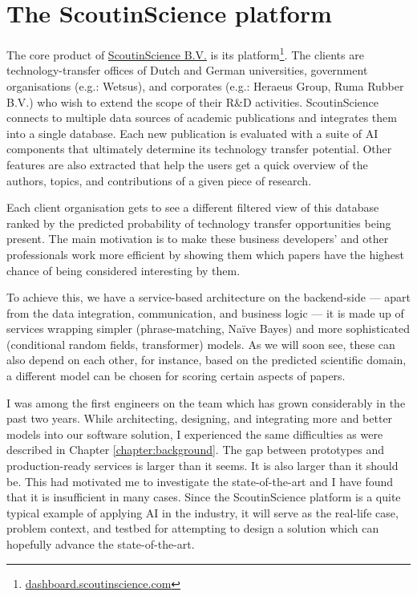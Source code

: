 \chapter{The ScoutinScience platform} \label{chapter:case}

The core product of \href{https://scoutinscience.com/}{ScoutinScience B.V.} is its platform\footnote{\href{https://dashboard.scoutinscience.com/}{dashboard.scoutinscience.com}}. The clients are technology-transfer offices of Dutch and German universities, government organisations (e.g.: Wetsus), and corporates (e.g.: Heraeus Group, Ruma Rubber B.V.) who wish to extend the scope of their R\&D activities. ScoutinScience connects to multiple data sources of academic publications and integrates them into a single database. Each new publication is evaluated with a suite of AI components that ultimately determine its technology transfer potential. Other features are also extracted that help the users get a quick overview of the authors, topics, and contributions of a given piece of research.

Each client organisation gets to see a different filtered view of this database ranked by the predicted probability of technology transfer opportunities being present. The main motivation is to make these business developers' and other professionals work more efficient by showing them which papers have the highest chance of being considered interesting by them. 

To achieve this, we have a service-based architecture \cite{kleppmann2017designing} on the backend-side --- apart from the data integration, communication, and business logic --- it is made up of services wrapping simpler (phrase-matching, Naïve Bayes) and more sophisticated (conditional random fields, transformer) models. As we will soon see, these can also depend on each other, for instance, based on the predicted scientific domain, a different model can be chosen for scoring certain aspects of papers.

I was among the first engineers on the team which has grown considerably in the past two years. While architecting, designing, and integrating more and better models into our software solution, I experienced the same difficulties as were described in Chapter \ref{chapter:background}. The gap between prototypes and production-ready services is larger than it seems. It is also larger than it should be. This had motivated me to investigate the state-of-the-art and I have found that it is insufficient in many cases. Since the ScoutinScience platform is a quite typical example of applying AI in the industry, it will serve as the real-life case, problem context, and testbed for attempting to design a solution which can hopefully advance the state-of-the-art.

